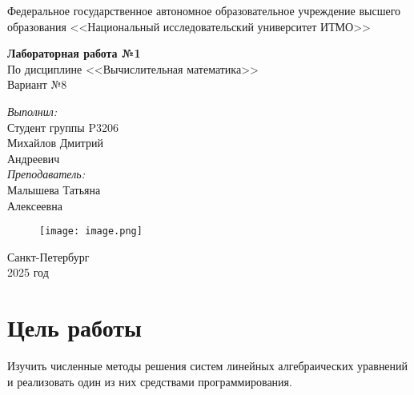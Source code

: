 \documentclass[12pt]{report}
\begin{document}
\begin{titlepage}
    \begin{center}
        \large{Федеральное государственное автономное образовательное учреждение высшего образования <<Национальный исследовательский университет ИТМО>>}
    \end{center}
    
    \vspace{15em}
    
    \begin{center}
        \huge{\textbf{Лабораторная работа №1}} \\
        \large{По дисциплине <<Вычислительная математика>>} \\
        \large{Вариант №8}
    \end{center}
    
    \vspace{5em}
    
    \begin{flushright}
        \textit{\large{Выполнил:}} \\
        \large{Студент группы P3206} \\
        \large{Михайлов Дмитрий} \\
        \large{Андреевич} \\
        \textit{\large{Преподаватель:}} \\
        \large{Малышева Татьяна} \\
        \large{Алексеевна}
    \end{flushright}

    \vspace{2cm}

    \begin{figure}[h]
        \centering
        \texttt{[image: image.png]}
    \end{figure}
    
    \begin{center}
        Санкт-Петербург \\
        2025 год
    \end{center}
\end{titlepage}

\tableofcontents
\newpage

\section*{Цель работы}
Изучить численные методы решения систем линейных алгебраических уравнений и реализовать один из них средствами программирования.
\end{document}

